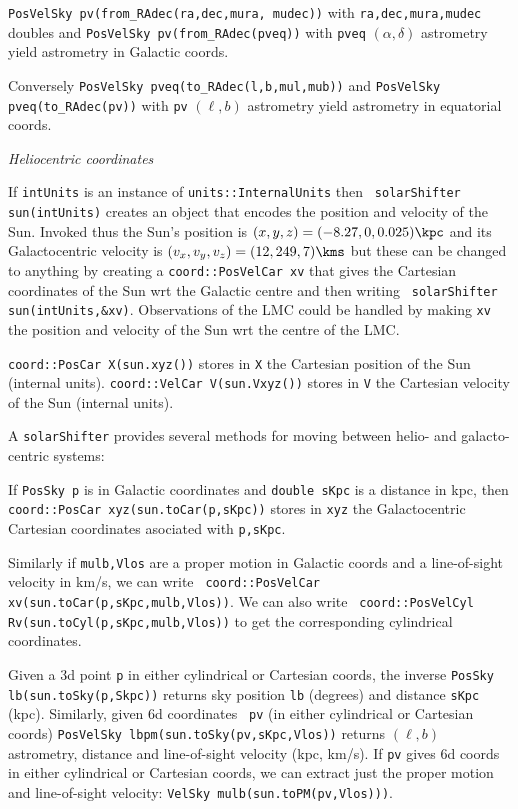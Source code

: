 \nwsec
{\tt PosVelSky pv(from\_RAdec(ra,dec,mura,
mudec))} with {\tt ra,dec,mura,mudec} doubles and
{\tt PosVelSky pv(from\_RAdec(pveq))} with {\tt pveq} $(\alpha,\delta)$
astrometry  yield astrometry in Galactic coords. 

\nwsec 
Conversely {\tt PosVelSky pveq(to\_RAdec(l,b,mul,mub))} and 
{\tt PosVelSky pveq(to\_RAdec(pv))} with {\tt pv} $(\ell,b)$ astrometry 
yield astrometry in equatorial coords. 

\bigskip
\centerline{\it Heliocentric coordinates}

\nwsec
If {\tt intUnits} is an instance of {\tt units::InternalUnits} then {\tt
solarShifter sun(intUnits)} creates an object that encodes the position
and velocity
of the Sun. Invoked thus the Sun's position is $(x,y,z)=(-8.27,0,0.025)\kpc$
and its
Galactocentric velocity is $(v_x,v_y,v_z)=(12,249,7)\kms$ but these can be
changed to anything by creating a {\tt coord::PosVelCar xv} that gives the Cartesian
coordinates of the Sun wrt the Galactic centre and then writing {\tt
solarShifter sun(intUnits,\&xv)}. Observations of the LMC
could be handled by making {\tt xv} the position and velocity of the Sun wrt
the centre of the LMC.

\nwsec
{\tt coord::PosCar X(sun.xyz())} stores in {\tt X} the Cartesian position of the
Sun (internal units). {\tt coord::VelCar V(sun.Vxyz())} stores in {\tt V} the
Cartesian velocity of the Sun (internal units). 

\nwsec
A {\tt solarShifter} provides several
methods for moving between helio- and galacto-centric systems:

\nwsec
If {\tt PosSky p} is in Galactic coordinates and {\tt double sKpc} is a
distance in kpc,
then {\tt coord::PosCar xyz(sun.toCar(p,sKpc))} stores in {\tt xyz}  the Galactocentric
Cartesian coordinates asociated with {\tt p,sKpc}. 

\nwsec
Similarly if {\tt mulb,Vlos} are a proper motion in Galactic coords and a
line-of-sight velocity in km/s, we can write {\tt
coord::PosVelCar xv(sun.toCar(p,sKpc,mulb,Vlos))}. We can also write
{\tt
coord::PosVelCyl Rv(sun.toCyl(p,sKpc,mulb,Vlos))} to get the corresponding cylindrical
coordinates. 

\nwsec
Given a 3d point {\tt p} in either cylindrical or Cartesian coords, the
inverse\hfil{} {\tt PosSky lb(sun.toSky(p,Skpc))} returns sky position {\tt lb}
(degrees) and distance {\tt sKpc} (kpc). Similarly, given 6d coordinates {\tt
pv} (in either cylindrical or Cartesian coords) {\tt PosVelSky
lbpm(sun.toSky(pv,sKpc,Vlos))} returns $(\ell,b)$ astrometry, distance and
line-of-sight velocity (kpc, km/s).  If {\tt pv} gives 6d coords in either
cylindrical or Cartesian coords, we can extract just the proper motion and
line-of-sight velocity: {\tt VelSky mulb(sun.toPM(pv,Vlos)))}.

